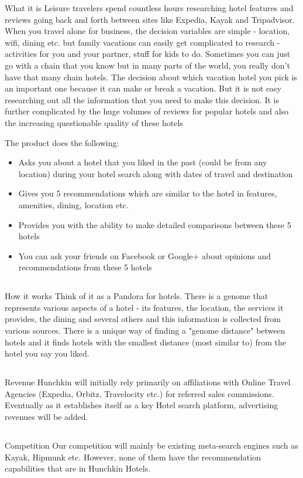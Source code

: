 \documentclass[DIV=calc, paper=a4, fontsize=11pt, twocolumn]{scrartcl}	 %
\newcommand{\initial}[1]{ %
\lettrine[lines=2,lhang=0.1,nindent=0em]{
\color{DarkGoldenrod}
{\textsf{#1}}}{}}
\begin{document}
\initial{What it is }
Leisure travelers spend countless hours researching hotel features and reviews going back and forth between sites like Expedia, Kayak and Tripadvisor. When you travel alone for business, the decision variables are simple - location, wifi, dining etc. but family vacations can easily get complicated to research - activities for you and your partner, stuff for kids to do. Sometimes you can just go with a chain that you know but in many parts of the world, you really don't have that many chain hotels. The decision about which vacation hotel you pick is an important one because it can make or break a vacation. But it is not easy researching out all the information that you need to make this decision. It is further complicated by the huge volumes of reviews for popular hotels and also the increasing questionable quality of these hotels
\par
The product does the following:
\begin{itemize}
\item Asks you about a hotel that you liked in the past (could be from any location) during your hotel search along with dates of travel and destination
\item Gives you 5 recommendations which are similar to the hotel in features, amenities, dining, location etc.
\item Provides you with the ability to make detailed comparisons between these 5 hotels
\item You can ask your friends on Facebook or Google+ about opinions and recommendations from these 5 hotels
\end{itemize}

\subsection*{}

\initial{How it works }
Think of it as a Pandora for hotels. There is a genome that represents various aspects of a hotel - its features, the location, the services it provides, the dining and several others and this information is collected from various sources. There is a unique way of finding a "genome distance" between hotels and it finds hotels with the smallest distance (most similar to) from the hotel you say you liked. 

\subsection*{}

\initial{Revenue }
Hunchkin will initially rely primarily on affiliations with Online Travel Agencies (Expedia, Orbitz, Travelocity etc.) for referred sales commissions. Eventually as it establishes itself as a key Hotel search platform, advertising revenues will be added.


\subsection*{}

\initial{Competition }
Our competition will mainly be existing meta-search engines such as Kayak, Hipmunk etc. However, none of them have the recommendation capabilities that are in Hunchkin Hotels. 
\end{document}
